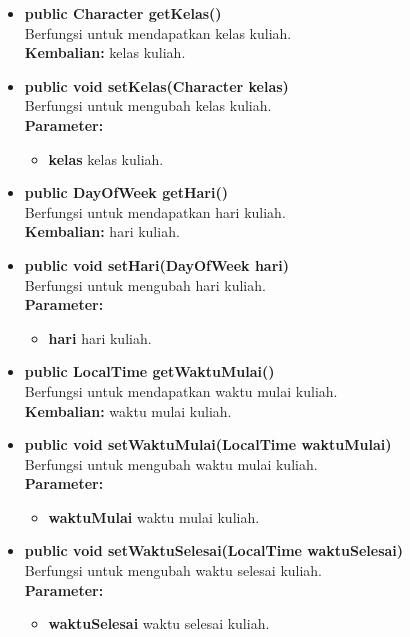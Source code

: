 \begin{enumerate}
\begin{enumerate}
\begin{itemize}
			\item \textbf{public Character getKelas()}\\
				Berfungsi untuk mendapatkan kelas kuliah.\\
				\textbf{Kembalian:} kelas kuliah.

			\item \textbf{public void setKelas(Character kelas)}\\
				Berfungsi untuk mengubah kelas kuliah.\\
				\textbf{Parameter:}
				\begin{itemize}
					\item \textbf{kelas} kelas kuliah.
				\end{itemize}
				
			\item \textbf{public DayOfWeek getHari()}\\
				Berfungsi untuk mendapatkan hari kuliah.\\
				\textbf{Kembalian:} hari kuliah.

			\item \textbf{public void setHari(DayOfWeek hari)}\\
				Berfungsi untuk mengubah hari kuliah.\\
				\textbf{Parameter:}
				\begin{itemize}
					\item \textbf{hari} hari kuliah.
				\end{itemize}
			\item \textbf{public LocalTime getWaktuMulai()}\\
				Berfungsi untuk mendapatkan waktu mulai kuliah.\\
				\textbf{Kembalian:} waktu mulai kuliah.

			\item \textbf{public void setWaktuMulai(LocalTime waktuMulai)}\\
				Berfungsi untuk mengubah waktu mulai kuliah.\\
				\textbf{Parameter:}
				\begin{itemize}
					\item \textbf{waktuMulai} waktu mulai kuliah.
				\end{itemize}
				
			\item \textbf{public void setWaktuSelesai(LocalTime waktuSelesai)}\\
				Berfungsi untuk mengubah waktu selesai kuliah.\\
				\textbf{Parameter:}
				\begin{itemize}
					\item \textbf{waktuSelesai} waktu selesai kuliah.
				\end{itemize}
			

\end{itemize}
\end{enumerate}
\end{enumerate}

